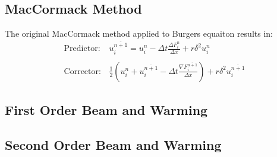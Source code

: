 \documentclass[11pt, a4paper]{article}
\begin{document}

\subsection{MacCormack Method}
The original MacCormack method applied to Burgers equaiton results in:
\begin{equation}
    \begin{array}{cc}
        \displaystyle\mathrm{Predictor:} & u_i^{\overline{n+1}}=u_i^n-\Delta t\frac{\Delta F_i^n}{\Delta x}+r\delta^2u_i^n \\\\ 
        \displaystyle\mathrm{Corrector:} & \frac{1}{2}\left(u_i^n+u_i^{\overline{n+1}}-\Delta t\frac{\nabla F_i^{\overline{n+1}}}{\Delta x}\right)+r\delta^2u_i^{\overline{n+1}}
    \end{array}
\end{equation}

\subsection{First Order Beam and Warming}

\subsection{Second Order Beam and Warming}
\end{document}
